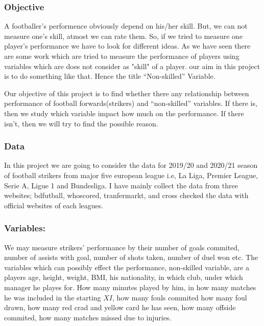 \documentclass[12pt]{article}
\begin{document}
\subsubsection{Objective}
A footballer’s performence obviously depend on his/her skill. But, we can not measure one’s skill, atmost we can rate them. So, if we tried to measure one player’s performance we have to look for different ideas. As we have seen there are some work which are tried to measure the performance of players using variables which are does not consider as "skill" of a player. our aim in this project is to do something like that. Hence the title “Non-skilled” Variable.

Our objective of this project is to find whether there any relationship between performance of football forwards(strikers) and “non-skilled” variables. If there is, then we study which variable impact how much on the performance. If there isn’t, then we will try to find the possible reason.


\subsubsection{Data}
In this project we are going to consider the data for 2019/20 and 2020/21 season of football strikers from major five european league i.e, La Liga, Premier League, Serie A, Ligue 1 and Bundesliga. I have mainly collect the data from three websites; bdfutball, whoscored, tranfermarkt, and cross checked the data with official websites of each leagues. 

\subsubsection*{Variables:}
We may measure strikers’ performance by their number of goals commited, number of assists with goal, number of shots taken, number of duel won etc. The variables which can possibly effect the performance, non-skilled variable, are a players age, height, weight, BMI, his nationality, in which club, under which manager he playes for. How many minutes played by him, in how many matches he was included in the starting $ XI $, how many fouls commited how many foul drawn, how many red crad and yellow card he has seen, how many offside commited, how many matches missed due to injuries.
\end{document}
